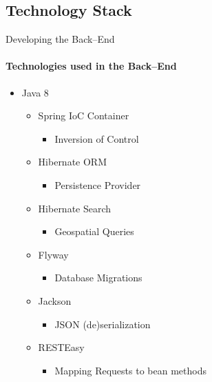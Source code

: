     \subsection{Technology Stack}
        \begin{frame}{Developing the Back--End}\framesubtitle{Technologies used in the Back--End}
             \begin{itemize}
                 \item Java 8
                 \begin{itemize}
                    \item Spring IoC Container
                    \begin{itemize}
                        \item Inversion of Control
                    \end{itemize}
                    \item Hibernate ORM
                    \begin{itemize}
                        \item Persistence Provider
                    \end{itemize}
                    \item Hibernate Search
                    \begin{itemize}
                        \item Geospatial Queries
                    \end{itemize}
                    \item Flyway
                    \begin{itemize}
                        \item Database Migrations
                    \end{itemize}
                    \item Jackson
                    \begin{itemize}
                        \item JSON (de)serialization 
                    \end{itemize}
                    \item RESTEasy
                    \begin{itemize}
                        \item Mapping Requests to bean methods
                    \end{itemize}
                 \end{itemize}
             \end{itemize}
        \end{frame}
